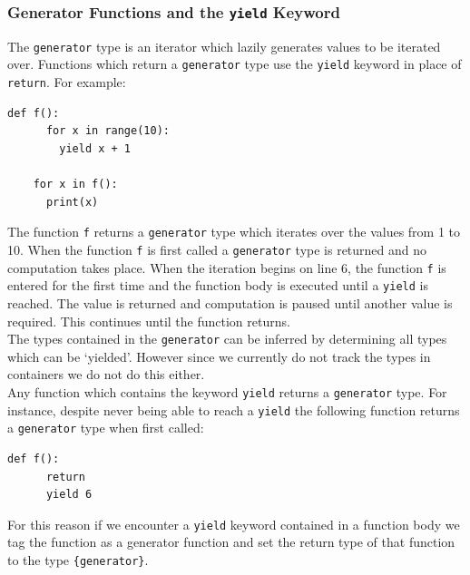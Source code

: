 \documentclass[12pt, titlepage]{article}
\begin{document}
\subsubsection{Generator Functions and the \texttt{yield} Keyword}
The \texttt{generator} type is an iterator which lazily generates values to be iterated over. Functions which return a \texttt{generator} type use the \texttt{yield} keyword in place of \texttt{return}. For example:
\begin{lstlisting}[mathescape]
    def f():
      for x in range(10):
        yield x + 1
    
    for x in f():
      print(x)
\end{lstlisting}
The function \texttt{f} returns a \texttt{generator} type which iterates over the values from 1 to 10. When the function \texttt{f} is first called a \texttt{generator} type is returned and no computation takes place. When the iteration begins on line 6, the function \texttt{f} is entered for the first time and the function body is executed until a \texttt{yield} is reached. The value is returned and computation is paused until another value is required. This continues until the function returns. \\
\indent The types contained in the \texttt{generator} can be inferred by determining all types which can be `yielded'. However since we currently do not track the types in containers we do not do this either. \\
\indent Any function which contains the keyword \texttt{yield} returns a \texttt{generator} type. For instance, despite never being able to reach a \texttt{yield} the following function returns a \texttt{generator} type when first called:
\begin{lstlisting}[mathescape]
    def f():
      return
      yield 6
\end{lstlisting}
For this reason if we encounter a \texttt{yield} keyword contained in a function body we tag the function as a generator function and set the return type of that function to the type \texttt{\{generator\}}.
\end{document}
